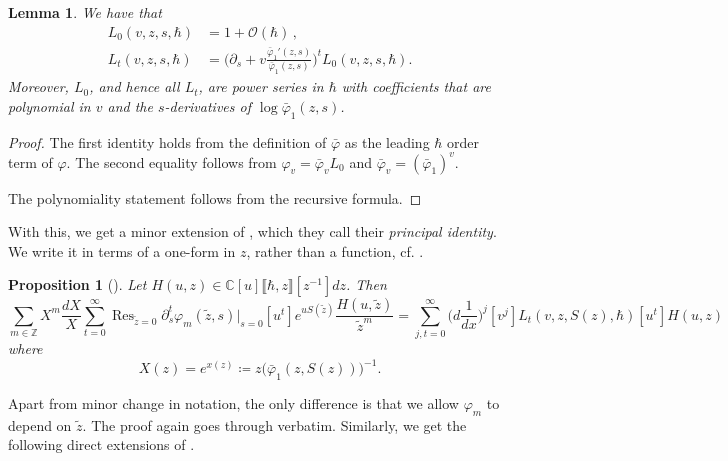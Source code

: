 \documentclass[10pt,a4paper,oneside,no-math,reqno]{amsart}%
\theoremstyle{plain}
\newtheorem{proposition}[theorem]{Proposition}
\newtheorem{lemma}[theorem]{Lemma}
\newtheorem{corollary}[theorem]{Corollary}
\theoremstyle{definition}
\theoremstyle{remark}
\numberwithin{equation}{section}
\renewcommand{\phi}{\varphi}
\newcommand{\mb}[1]{\mathbb{#1}}
\newcommand{\mc}[1]{\mathcal{#1}}
\newcommand{\1}{\mathds{1}}
\newcommand{\C}{\mb{C}}
\newcommand{\Z}{\mb{Z}}
\newcommand{\<}{\langle}
\renewcommand{\>}{\rangle}
\newcommand{\del}{\partial}
\DeclareMathOperator*{\Res}{Res}
\begin{document}
\begin{lemma}
	We have that
	\begin{align}
		L_0(v,z,s,\hbar) 
		&= 
		1 + \mc{O} (\hbar) \,,
		\\
		L_t(v,z,s,\hbar)
		&=
		\Big( \del_s + v \frac{\bar{\phi}_1' (z, s)}{\bar{\phi}_1 (z, s)} \Big)^t L_0 (v,z,s, \hbar) .
	\end{align}
	Moreover, $ L_0$, and hence all $ L_t$, are power series in $ \hbar$ with coefficients that are polynomial in $v$ and the $s$-derivatives of $ \log \bar{\phi}_1 (z, s)$.
\end{lemma}

\begin{proof}
	The first identity holds from the definition of $ \bar{\phi}$ as the leading $ \hbar$ order term of $ \phi$. The second equality follows from $ \phi_v=\bar{\phi}_vL_0$ and $ \bar{\phi}_v = (\bar{\phi}_1)^v$.\par
	The polynomiality statement follows from the recursive formula.
\end{proof}

With this, we get a minor extension of \cite[Proposition 4.3]{BDKS22}, which they call their \emph{principal identity}. We write it in terms of a one-form in $z$, rather than a function, cf. \cite[Proposition 4.4]{ABDKS24}.

\begin{proposition}[{\cite[Proposition 4.3]{BDKS22}}]
	Let $H(u, z) \in \C [u]\llbracket \hbar, z \rrbracket [z^{-1}] dz $. Then
	\begin{equation}
		\sum_{m \in \Z} X^m\frac{dX}{X} \sum_{t = 0}^\infty \Res_{\tilde{z} = 0} \del_s^t \phi_m (\tilde{z},s) \big|_{s = 0} [u^t] e^{u S(\tilde{z})} \frac{H(u,\tilde{z})}{\tilde{z}^m}
		=
		\sum_{j,t = 0}^\infty \big( d \frac{1}{dx} \big)^j [v^j] L_t(v, z, S(z),\hbar) [u^t] H(u,z)
	\end{equation}
	where
	\begin{equation}
		X(z)
        =
        e^{x(z)}
		\coloneqq
		z  \big( \bar{\phi}_1(z,S(z)) \big)^{-1} .
	\end{equation}
\end{proposition}

Apart from minor change in notation, the only difference is that we allow $ \phi_m$ to depend on $ \tilde{z}$. The proof again goes through verbatim. Similarly, we get the following direct extensions of \cite[Corollary 4.4, Theorem 4.8, Corollary 4.10]{BDKS22}.

\end{document}
